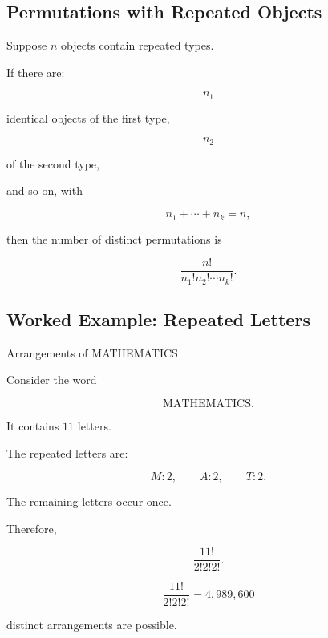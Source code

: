 \subsection{Permutations with Repeated Objects}
\label{subsec:permutations-repeated-objects}

Suppose \(n\) objects contain repeated types.

If there are:

\[
n_1
\]

identical objects of the first type,

\[
n_2
\]

of the second type,

and so on, with

\[
n_1+\cdots+n_k=n,
\]

then the number of distinct permutations is

\[
\boxed{
\frac{n!}{n_1!n_2!\cdots n_k!}.
}
\]

\subsection{Worked Example: Repeated Letters}
\label{subsec:worked-repeated-letters}

\begin{workedexamplebox}{Arrangements of MATHEMATICS}

Consider the word

\[
\text{MATHEMATICS}.
\]

It contains \(11\) letters.

The repeated letters are:

\[
M:2,
\qquad
A:2,
\qquad
T:2.
\]

The remaining letters occur once.

Therefore,

\[
\frac{11!}{2!2!2!}.
\]

\begin{answerbox}
\[
\boxed{
\frac{11!}{2!2!2!}
=
4,989,600
}
\]

distinct arrangements are possible.
\end{answerbox}

\end{workedexamplebox}

